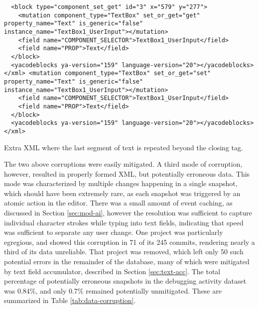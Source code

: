 \begin{listing}
\begin{verbatim}
  <block type="component_set_get" id="3" x="579" y="277">
    <mutation component_type="TextBox" set_or_get="get" property_name="Text" is_generic="false" instance_name="TextBox1_UserInput"></mutation>
    <field name="COMPONENT_SELECTOR">TextBox1_UserInput</field>
    <field name="PROP">Text</field>
  </block>
  <yacodeblocks ya-version="159" language-version="20"></yacodeblocks>
</xml> <mutation component_type="TextBox" set_or_get="set" property_name="Text" is_generic="false" instance_name="TextBox1_UserInput"></mutation>
    <field name="COMPONENT_SELECTOR">TextBox1_UserInput</field>
    <field name="PROP">Text</field>
  </block>
  <yacodeblocks ya-version="159" language-version="20"></yacodeblocks>
</xml>
\end{verbatim}
\caption[Extra XML beyond the closing tag]{Extra XML where the last segment of text is repeated beyond the closing tag.}
\label{list:badxmltrailing}
\end{listing}

The two above corruptions were easily mitigated. A third mode of corruption, however, resulted in properly formed XML, but potentially erroneous data. This mode was characterized by multiple changes happening in a single snapshot, which should have been extremely rare, as each snapshot was triggered by an atomic action in the editor. There was a small amount of event caching, as discussed in Section \ref{sec:mod-ai}, however the resolution was sufficient to capture individual character strokes while typing into text fields, indicating that speed was sufficient to separate any user change. One project was particularly egregious, and showed this corruption in 71 of its 245 commits, rendering nearly a third of its data unreliable. That project was removed, which left only 50 such potential errors in the remainder of the database, many of which were mitigated by text field accumulator, described in Section \ref{sec:text-acc}. The total percentage of potentially erroneous snapshots in the debugging activity dataset was 0.84\%, and only 0.7\% remained potentially unmitigated. These are summarized in Table \ref{tab:data-corruption}.

	
